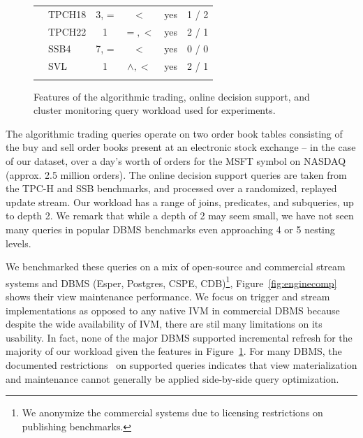 \begin{figure}[t]
{\begin{center}
\begin{tabular}{ p{0.15cm} | l | c | c | c  | c }
& TPCH18     & 3, =      & $<$           & yes & 1 / 2 \\
& TPCH22     & 1         & $=,<$         & yes & 2 / 1 \\
& SSB4       & 7, =      & $<$           & yes & 0 / 0 \\
\hline
\comment{
& SVL        & 1         & $\wedge, <$   & yes & 2 / 1 \\
}
\end{tabular}
\end{center}
}
\vspace{-4mm}
\caption{Features of the algorithmic trading, online decision support, and
cluster monitoring query workload used for experiments.}
\label{fig:queries}
\vspace{-4mm}
\end{figure}

The algorithmic trading queries operate on two order book tables consisting of
the buy and sell order books present at an electronic stock exchange -- in the
case of our dataset, over a day's worth of orders for the MSFT symbol on NASDAQ
(approx. 2.5 million orders). The online decision support queries are taken from
the TPC-H and SSB benchmarks, and processed over a randomized, replayed update
stream. 
Our workload has a range of joins, predicates, and subqueries, up to depth 2. We
remark that while a depth of 2 may seem small, we have not seen many queries in
popular DBMS benchmarks even approaching 4 or 5 nesting levels.

We benchmarked these queries on a mix of open-source and commercial stream
systems and DBMS (Esper, Postgres, CSPE, CDB)\footnote{We anonymize the
commercial systems due to licensing restrictions on publishing benchmarks.},
Figure~\ref{fig:enginecomp} shows their view maintenance performance.
We focus on trigger and stream implementations as opposed to any native IVM in
commercial DBMS because despite the wide availability of IVM, there are stil
many limitations on its usability.
In fact, none of the major DBMS supported incremental refresh for the
majority of our workload given the features in Figure~\ref{fig:queries}.
For many DBMS, the documented
restrictions~\cite{mssql-viewrestrict,oracle-viewrestrict,db2-viewrestrict} on
supported queries indicates that view materialization and maintenance cannot
generally be applied side-by-side query optimization.

